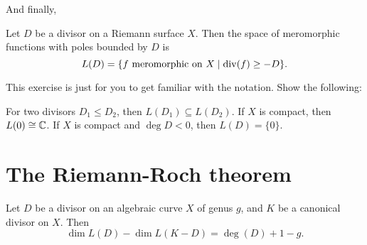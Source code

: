 And finally,
\begin{definition}
	Let $D$ be a divisor on a Riemann surface $X$.
	Then the space of meromorphic functions with poles bounded by $D$ is
	\[
		L(D) = \{ \text{$f$ meromorphic on $X$} \mid \operatorname{div}(f) \geq -D \}.
	\]
\end{definition}

\begin{exercise}
	This exercise is just for you to get familiar with the notation. Show the following:
	\begin{itemize}
		\ii For two divisors $D_1 \leq D_2$, then $L(D_1) \subseteq L(D_2)$.
		\ii If $X$ is compact, then $L(0) \cong \mathbb C$.
		\ii If $X$ is compact and $\deg D < 0$, then $L(D) = \{ 0 \}$.
	\end{itemize}
\end{exercise}

\section{The Riemann-Roch theorem}


\begin{theorem}
	Let $D$ be a divisor on an algebraic curve $X$ of genus $g$, and $K$ be a canonical divisor on
	$X$. Then
	\[ \dim L(D) - \dim L(K-D) = \deg(D) + 1 - g. \]
\end{theorem}



